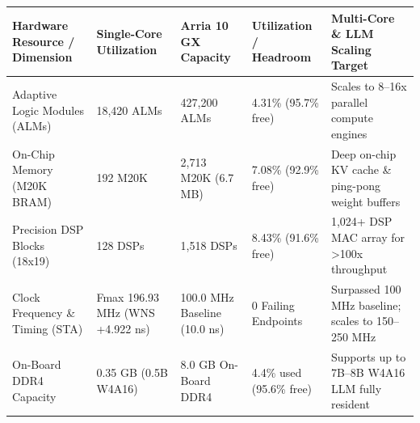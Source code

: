 \documentclass[11pt,a4paper]{article}
\begin{document}
{\footnotesize\renewcommand{\arraystretch}{1.14}\begin{longtable}{@{}L{0.21\textwidth}L{0.16\textwidth}L{0.16\textwidth}L{0.15\textwidth}L{0.22\textwidth}@{}}\toprule

\textbf{Hardware Resource /\allowbreak{} Dimension} & \textbf{Single-Core Utilization} & \textbf{Arria 10 GX Capacity} & \textbf{Utilization /\allowbreak{} Headroom} & \textbf{Multi-Core \& LLM Scaling Target}\\\midrule\endhead

Adaptive Logic Modules (\allowbreak{}ALMs)\allowbreak{} & 18,\allowbreak{}420 ALMs & 427,\allowbreak{}200 ALMs & 4.31\% (\allowbreak{}95.7\% free)\allowbreak{} & Scales to 8--16x parallel compute engines\\[2pt]

On-Chip Memory (\allowbreak{}M20K BRAM)\allowbreak{} & 192 M20K & 2,\allowbreak{}713 M20K (\allowbreak{}6.7 MB)\allowbreak{} & 7.08\% (\allowbreak{}92.9\% free)\allowbreak{} & Deep on-chip KV cache \& ping-pong weight buffers\\[2pt]

Precision DSP Blocks (\allowbreak{}18x19)\allowbreak{} & 128 DSPs & 1,\allowbreak{}518 DSPs & 8.43\% (\allowbreak{}91.6\% free)\allowbreak{} & 1,\allowbreak{}024+\allowbreak{} DSP MAC array for >100x throughput\\[2pt]

Clock Frequency \& Timing (\allowbreak{}STA)\allowbreak{} & Fmax 196.93 MHz (\allowbreak{}WNS +\allowbreak{}4.922 ns)\allowbreak{} & 100.0 MHz Baseline (\allowbreak{}10.0 ns)\allowbreak{} & 0 Failing Endpoints & Surpassed 100 MHz baseline; scales to 150--250 MHz\\[2pt]

On-Board DDR4 Capacity & 0.35 GB (\allowbreak{}0.5B W4A16)\allowbreak{} & 8.0 GB On-Board DDR4 & 4.4\% used (\allowbreak{}95.6\% free)\allowbreak{} & Supports up to 7B--8B W4A16 LLM fully resident\\[2pt]

\bottomrule\end{longtable}}
\end{document}
